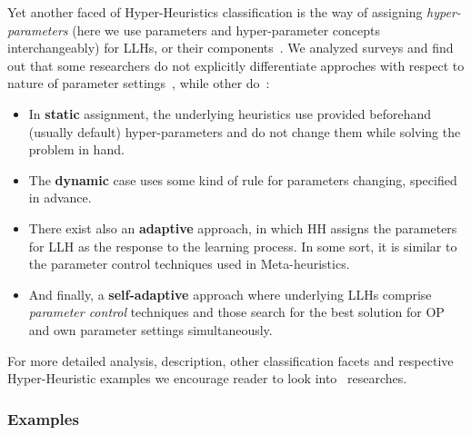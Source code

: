 Yet another faced of Hyper-Heuristics classification is the way of assigning \textit{hyper-parameters} (here we use parameters and hyper-parameter concepts interchangeably) for LLHs, or their components~\cite{drake2019recent}. We analyzed surveys and find out that some researchers do not explicitly differentiate approches with respect to nature of parameter settings~\cite{ryser2014review,burke2013hyper,burke2019classification}, while other do~\cite{drake2019recent}:
\begin{itemize}
	\item In \textbf{static} assignment, the underlying heuristics use provided beforehand (usually default) hyper-parameters and do not change them while solving the problem in hand.

	\item The \textbf{dynamic} case uses some kind of rule for parameters changing, specified in advance.

	\item There exist also an \textbf{adaptive} approach, in which HH assigns the parameters for LLH as the response to the learning process. In some sort, it is similar to the parameter control techniques used in Meta-heuristics.
	
	\item And finally, a \textbf{self-adaptive} approach where underlying LLHs comprise \textit{parameter control} techniques and those search for the best solution for OP and own parameter settings simultaneously.
\end{itemize}


For more detailed analysis, description, other classification facets and respective Hyper-Heuristic examples we encourage reader to look into~\cite{burke2003hyper,ryser2014review,drake2019recent,burke2019classification} researches.

\subsubsection{Examples}\label{bg: hh examples}%
